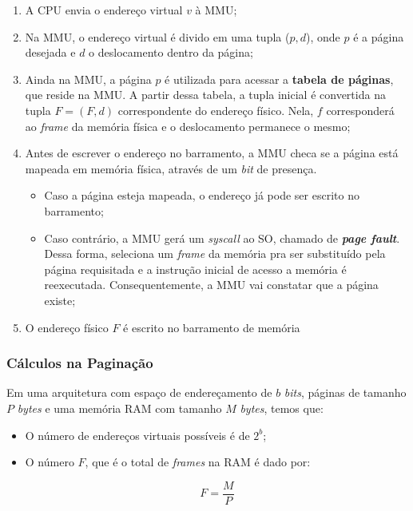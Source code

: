 \begin{enumerate}
  \item A CPU envia o endereço virtual $v$ à MMU;

  \item Na MMU, o endereço virtual é divido em uma tupla ($p,d$), onde $p$ é a página desejada e $d$ o deslocamento dentro da página;

  \item Ainda na MMU, a página $p$ é utilizada para acessar a \textbf{tabela de páginas}, que reside na MMU. A partir dessa tabela, a tupla inicial é convertida na tupla $F = (F,d)$ correspondente do endereço físico. Nela, $f$ corresponderá ao \textit{frame} da memória física e o deslocamento permanece o mesmo;

  \item Antes de escrever o endereço no barramento, a MMU checa se a página está mapeada em memória física, através de um \textit{bit} de presença.

  \begin{itemize}
    \item Caso a página esteja mapeada, o endereço já pode ser escrito no barramento;

    \item Caso contrário, a MMU gerá um \textit{syscall} ao SO, chamado de \textbf{\textit{page fault}}. Dessa forma, seleciona um \textit{frame} da memória pra ser substituído pela página requisitada e a instrução inicial de acesso a memória é reexecutada. Consequentemente, a MMU vai constatar que a página existe;
  \end{itemize}

  \item O endereço físico $F$ é escrito no barramento de memória
\end{enumerate}


\subsubsection{Cálculos na Paginação}
Em uma arquitetura com espaço de endereçamento de $b$ \textit{bits}, páginas de tamanho $P$ \textit{bytes} e uma memória RAM com tamanho $M$ \textit{bytes}, temos que:

\begin{itemize}
  \item O número de endereços virtuais possíveis é de $2^b$;

  \item O número $F$, que é o total de \textit{frames} na RAM é dado por:

  \begin{equation*}
    F = \frac{M}{P}
  \end{equation*}
\end{itemize}

